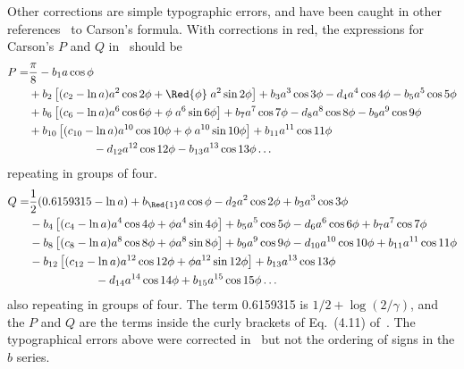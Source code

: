 \documentclass[12pt,fleqn]{article}
\begin{document}
Other corrections are simple typographic errors, and have been caught in other references~\cite{Wang} to Carson's formula. With corrections in red, the  expressions for Carson's $P$ and $Q$ in~\cite{EMTP} should be
\begin{align*}
   P = & \frac{\pi}{8} - b_1 a \cos\phi \\
    & + b_2 \left[ (c_2 - \ln a) a^2 \cos 2\phi + \Red{\phi}\; a^2 \sin 2\phi \right] + b_3 a^3 \cos 3\phi  - d_4 a^4 \cos 4\phi - b_5 a^5 \cos 5\phi \\
    & + b_6 \left[ (c_6 - \ln a) a^6 \cos 6\phi + \phi\; a^6 \sin 6\phi \right] + b_7 a^7 \cos 7\phi  - d_8 a^8 \cos 8\phi - b_9 a^9 \cos 9\phi \\
    & + b_{10} \left[ (c_{10} - \ln a) a^{10} \cos 10\phi + \phi\; a^{10} \sin 10\phi \right] + b_{11} a^{11} \cos 11\phi  \\
    & \text{\hskip20mm} - d_{12} a^{12} \cos 12\phi - b_{13} a^{13} \cos 13\phi \ldots
\end{align*}
repeating in groups of four.
\begin{align*}
   Q = & \frac{1}{2}(0.6159315 - \ln a) + b_{\Red{1}} a \cos\phi - d_2 a^2 \cos 2\phi + b_3 a^3 \cos 3\phi \\
    & - b_4 \left[ (c_4 - \ln a) a^4 \cos 4\phi + \phi a^4 \sin 4\phi \right] + b_5 a^5 \cos 5\phi  - d_6 a^6 \cos 6\phi + b_7 a^7 \cos 7\phi \\
    & - b_8 \left[ (c_8 - \ln a) a^8 \cos 8\phi + \phi a^8 \sin 8\phi \right] + b_9 a^9 \cos 9\phi  - d_{10} a^{10} \cos 10\phi + b_{11} a^{11} \cos 11\phi \\
    & - b_{12} \left[ (c_{12} - \ln a) a^{12} \cos 12\phi + \phi a^{12} \sin 12\phi \right] + b_{13} a^{13} \cos 13\phi  \\
    & \text{\hskip20mm} - d_{14} a^{14} \cos 14\phi + b_{15} a^{15} \cos 15\phi \ldots
\end{align*}
also repeating in groups of four. The term 0.6159315 is $1/2 + \log(2/\gamma)$, and the $P$ and $Q$ are the terms inside the curly brackets of Eq.~(4.11) of~\cite{EMTP}. The typographical errors above were corrected in~\cite{Wang} but not the ordering of signs in the $b$ series.
\end{document}

